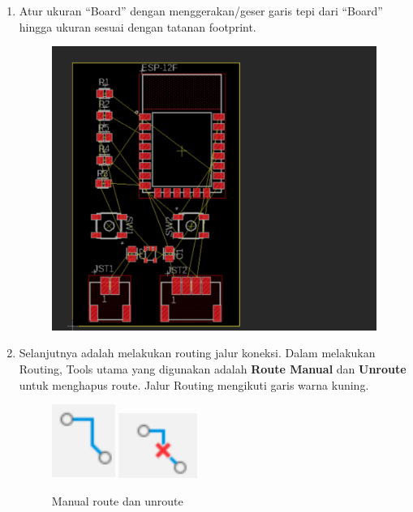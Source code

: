 \begin{enumerate}
\begin{figure}[H]
    \end{figure}
    \item Atur ukuran “Board” dengan menggerakan/geser garis tepi dari “Board” hingga ukuran
    sesuai dengan tatanan footprint.
        \begin{figure}[H]
            \centering
            \includegraphics[width=0.89\linewidth]{P1/img/aturukuranboard.png}
        \end{figure}
    \item Selanjutnya adalah melakukan routing jalur koneksi. Dalam melakukan Routing, Tools
    utama yang digunakan adalah \textbf{Route Manual} dan \textbf{Unroute} untuk
    menghapus route. Jalur Routing mengikuti garis warna kuning.
        \begin{figure}[H]
            \centering
            \includegraphics[width=0.12\linewidth]{P1/img/manualroute.png}
            \includegraphics[width=0.17\linewidth]{P1/img/unroute.png}
            \caption{Manual route dan unroute}
        \end{figure}
        \begin{figure}[H]
            \centering

\end{figure}
\end{enumerate}
